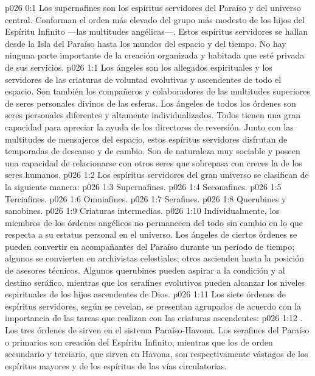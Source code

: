 \author{Perfeccionador de la sabiduría}
\vs p026 0:1 Los supernafines son los espíritus servidores del Paraíso y del universo central. Conforman el orden más elevado del grupo más modesto de los hijos del Espíritu Infinito ---las multitudes angélicas---. Estos espíritus servidores se hallan desde la Isla del Paraíso hasta los mundos del espacio y del tiempo. No hay ninguna parte importante de la creación organizada y habitada que esté privada de sus servicios.
\vs p026 1:1 Los ángeles son los allegados espirituales y los servidores de las criaturas de voluntad evolutivas y ascendentes de todo el espacio. Son también los compañeros y colaboradores de las multitudes superiores de seres personales divinos de las esferas. Los ángeles de todos los órdenes son seres personales diferentes y altamente individualizados. Todos tienen una gran capacidad para apreciar la ayuda de los directores de reversión. Junto con las multitudes de mensajeros del espacio, estos espíritus servidores disfrutan de temporadas de descanso y de cambio. Son de naturaleza muy sociable y poseen una capacidad de relacionarse con otros seres que sobrepasa con creces la de los seres humanos.
\vs p026 1:2 \pc Los espíritus servidores del gran universo se clasifican de la siguiente manera:
\vs p026 1:3 Supernafines.
\vs p026 1:4 Seconafines.
\vs p026 1:5 Terciafines.
\vs p026 1:6 Omniafines.
\vs p026 1:7 Serafines.
\vs p026 1:8 Querubines y sanobines.
\vs p026 1:9 Criaturas intermedias.
\vs p026 1:10 \pc Individualmente, los miembros de los órdenes angélicos no permanecen del todo sin cambio en lo que respecta a su estatus personal en el universo. Los ángeles de ciertos órdenes se pueden convertir en acompañantes del Paraíso durante un período de tiempo; algunos se convierten en archivistas celestiales; otros ascienden hasta la posición de asesores técnicos. Algunos querubines pueden aspirar a la condición y al destino seráfico, mientras que los serafines evolutivos pueden alcanzar los niveles espirituales de los hijos ascendentes de Dios.
\vs p026 1:11 \pc Los siete órdenes de espíritus servidores, según se revelan, se presentan agrupados de acuerdo con la importancia de las tareas que realizan con las criaturas ascendentes:
\vs p026 1:12 . Los tres órdenes de  sirven en el sistema Paraíso\hyp{}Havona. Los serafines del Paraíso o primarios son creación del Espíritu Infinito, mientras que los de orden secundario y terciario, que sirven en Havona, son respectivamente vástagos de los espíritus mayores y de los espíritus de las vías circulatorias.
